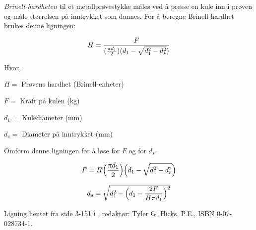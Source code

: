 

{\it Brinell-hardheten} til et metallprøvestykke måles ved å presse en kule inn i prøven og måle størrelsen på inntrykket som dannes. For å beregne Brinell-hardhet brukes denne ligningen:

$$H = {F \over ({\pi d_1 \over 2}) ({d_1 - \sqrt{d_1^2 - d_s^2}})}$$

\noindent
Hvor,

$H =$ Prøvens hardhet (Brinell-enheter)

$F =$ Kraft på kulen (kg)

$d_1 =$ Kulediameter (mm)

$d_s =$ Diameter på inntrykket (mm)

\vskip 10pt

Omform denne ligningen for å løse for $F$ og for $d_s$.







$$F = H \Bigl({\pi d_1 \over 2}\Bigr) \Bigl({d_1 - \sqrt{d_1^2 - d_s^2}}\Bigr)$$

\vskip 20pt

$$d_s = \sqrt{d_1^2 - \Bigl( d_1 - {2F \over H \pi d_1} \Bigr)^2}$$







Ligning hentet fra side 3-151 i , redaktør: Tyler G. Hicks, P.E., ISBN 0-07-028734-1.



